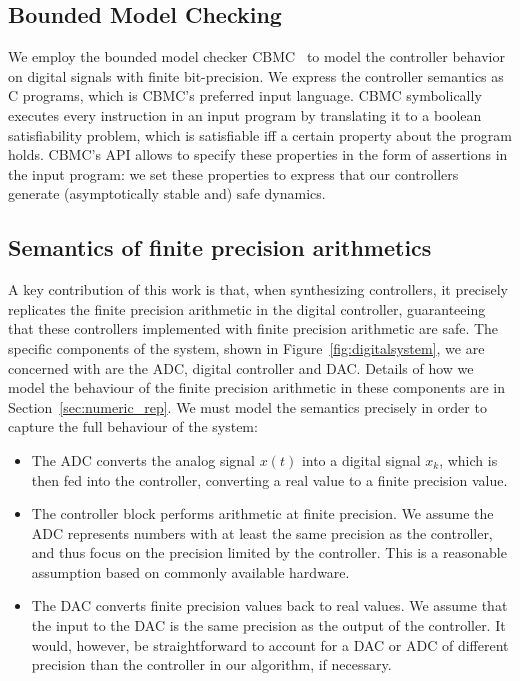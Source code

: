 \subsection{Bounded Model Checking}
\label{sec:BMC}

We employ the bounded model checker CBMC~\cite{DBLP:conf/tacas/KroeningT14} to model the controller behavior on digital signals with finite bit-precision.  
We express the controller semantics as C programs, which is CBMC's preferred input language.  
CBMC symbolically executes every instruction in an input program by translating it to a boolean satisfiability problem,
 which is satisfiable iff a certain property about the program holds.  
CBMC's API allows to specify these properties in the form of assertions in the input program: 
we set these properties to express that our controllers generate (asymptotically stable and) safe dynamics. 

\subsection{Semantics of finite precision arithmetics}
\label{sec:errors}

A key contribution of this work is that, when synthesizing controllers, it precisely replicates the finite precision arithmetic in the digital controller, guaranteeing that these controllers implemented with finite precision arithmetic are safe. 
The specific components of the system, shown in Figure~\ref{fig:digitalsystem}, we are concerned with are the ADC, digital controller and DAC.
Details of how we model the behaviour of the finite precision arithmetic in these components are in Section~\ref{sec:numeric_rep}. We must model the semantics precisely in order to capture the full behaviour of the system:  

\begin{itemize}

\item The ADC converts the analog signal $x(t)$ into a digital signal $x_k$, which is then fed into the controller, converting a real value to a finite precision value.  

\item The controller block performs arithmetic at finite precision. 
We assume the ADC represents numbers with at least the same precision as the controller, 
and thus focus on the precision limited by the controller. 
This is a reasonable assumption based on commonly available hardware. 

\item The DAC converts finite precision values back to real values. 
We assume that the input to the DAC is the same precision as the output of the controller. 
It would, however, be straightforward to account for a DAC or ADC of different precision than the controller in our algorithm, if necessary. 
\end{itemize}

